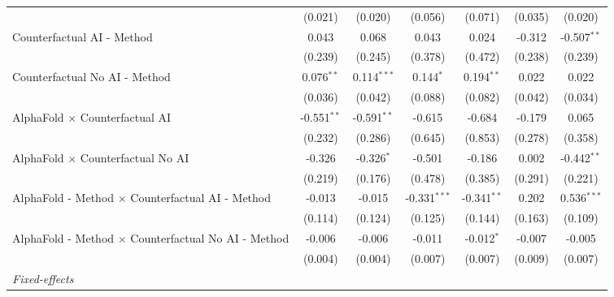 \begin{tabular}{lcccccc}
                                                              & (0.021)       & (0.020)       & (0.056)        & (0.071)       & (0.035)     & (0.020)\\   
   Counterfactual AI - Method                                 & 0.043         & 0.068         & 0.043          & 0.024         & -0.312      & -0.507$^{**}$\\   
                                                              & (0.239)       & (0.245)       & (0.378)        & (0.472)       & (0.238)     & (0.239)\\   
   Counterfactual No AI - Method                              & 0.076$^{**}$  & 0.114$^{***}$ & 0.144$^{*}$    & 0.194$^{**}$  & 0.022       & 0.022\\   
                                                              & (0.036)       & (0.042)       & (0.088)        & (0.082)       & (0.042)     & (0.034)\\   
   AlphaFold $\times$ Counterfactual AI                       & -0.551$^{**}$ & -0.591$^{**}$ & -0.615         & -0.684        & -0.179      & 0.065\\   
                                                              & (0.232)       & (0.286)       & (0.645)        & (0.853)       & (0.278)     & (0.358)\\   
   AlphaFold $\times$ Counterfactual No AI                    & -0.326        & -0.326$^{*}$  & -0.501         & -0.186        & 0.002       & -0.442$^{**}$\\   
                                                              & (0.219)       & (0.176)       & (0.478)        & (0.385)       & (0.291)     & (0.221)\\   
   AlphaFold - Method $\times$ Counterfactual AI - Method     & -0.013        & -0.015        & -0.331$^{***}$ & -0.341$^{**}$ & 0.202       & 0.536$^{***}$\\   
                                                              & (0.114)       & (0.124)       & (0.125)        & (0.144)       & (0.163)     & (0.109)\\   
   AlphaFold - Method $\times$ Counterfactual No AI - Method  & -0.006        & -0.006        & -0.011         & -0.012$^{*}$  & -0.007      & -0.005\\   
                                                              & (0.004)       & (0.004)       & (0.007)        & (0.007)       & (0.009)     & (0.007)\\   
   \midrule
   \emph{Fixed-effects}\\

\end{tabular}
